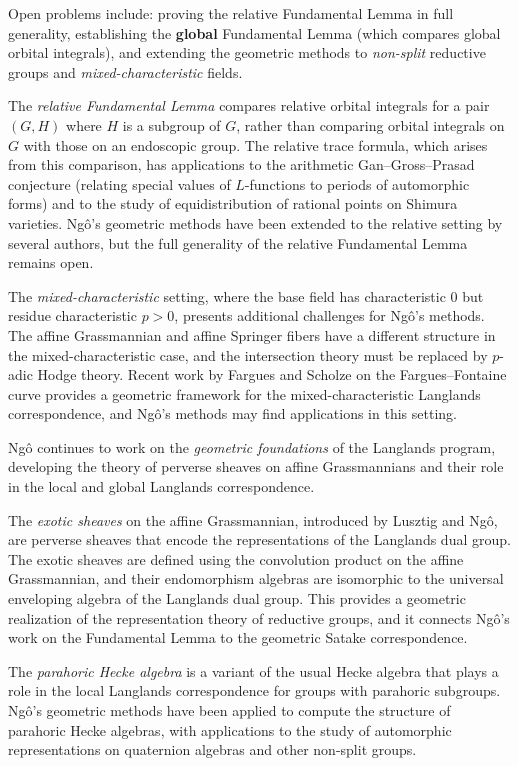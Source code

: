Open problems include: proving the relative Fundamental Lemma in full generality, establishing the \textbf{global} Fundamental Lemma (which compares global orbital integrals), and extending the geometric methods to \emph{non-split} reductive groups and \emph{mixed-characteristic} fields.

The \emph{relative Fundamental Lemma} compares relative orbital integrals for a pair $(G, H)$ where $H$ is a subgroup of $G$, rather than comparing orbital integrals on $G$ with those on an endoscopic group. The relative trace formula, which arises from this comparison, has applications to the arithmetic Gan--Gross--Prasad conjecture (relating special values of $L$-functions to periods of automorphic forms) and to the study of equidistribution of rational points on Shimura varieties. Ngô's geometric methods have been extended to the relative setting by several authors, but the full generality of the relative Fundamental Lemma remains open.

The \emph{mixed-characteristic} setting, where the base field has characteristic 0 but residue characteristic $p > 0$, presents additional challenges for Ngô's methods. The affine Grassmannian and affine Springer fibers have a different structure in the mixed-characteristic case, and the intersection theory must be replaced by $p$-adic Hodge theory. Recent work by Fargues and Scholze on the Fargues--Fontaine curve provides a geometric framework for the mixed-characteristic Langlands correspondence, and Ngô's methods may find applications in this setting.

Ngô continues to work on the \emph{geometric foundations} of the Langlands program, developing the theory of perverse sheaves on affine Grassmannians and their role in the local and global Langlands correspondence.

The \emph{exotic sheaves} on the affine Grassmannian, introduced by Lusztig and Ngô, are perverse sheaves that encode the representations of the Langlands dual group. The exotic sheaves are defined using the convolution product on the affine Grassmannian, and their endomorphism algebras are isomorphic to the universal enveloping algebra of the Langlands dual group. This provides a geometric realization of the representation theory of reductive groups, and it connects Ngô's work on the Fundamental Lemma to the geometric Satake correspondence.

The \emph{parahoric Hecke algebra} is a variant of the usual Hecke algebra that plays a role in the local Langlands correspondence for groups with parahoric subgroups. Ngô's geometric methods have been applied to compute the structure of parahoric Hecke algebras, with applications to the study of automorphic representations on quaternion algebras and other non-split groups.

